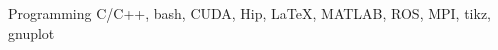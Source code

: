 


\begin{cvskills}


\cvskill
{Programming} %
{C/C++, bash, CUDA, Hip, LaTeX, MATLAB, ROS, MPI, tikz, gnuplot} %




\end{cvskills}